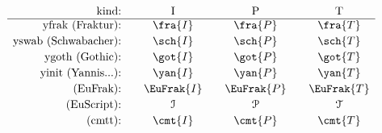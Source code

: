 \documentclass[12pt]{article}
\newcommand{\nor}[1]{{\rm #1}}
\begin{document}
\[ \begin{array}{r@{:\ \ \ \ \ \ }c@{\ \ \ \ \ \ }c@{\ \ \ \ \ \ }c}
\nor{kind}                 & \nor{I}     & \nor{P}     & \nor{T} \\ \hline
\nor{yfrak\ (Fraktur)}     & \fra{I}     & \fra{P}     & \fra{T} \\[.5ex]
\nor{yswab\ (Schwabacher)} & \sch{I}     & \sch{P}     &  \sch{T}\\[.5ex]
\nor{ygoth\ (Gothic)}      & \got{I}     & \got{P}     & \got{T} \\[.5ex]
\nor{yinit\ (Yannis...)}   &  \yan{I}    & \yan{P}     &  \yan{T} \\[.5ex]
\nor{(EuFrak)}             & \EuFrak{I}  & \EuFrak{P}  &  \EuFrak{T} \\[.5ex]
\nor{(EuScript)}           & \EuScript{I}& \EuScript{P}&  \EuScript{T} \\[.5ex]
\nor{(cmtt)}             & \cmt{I  }& \cmt{P  }&  \cmt{T} \\[.5ex]
 \end{array} 
\]
\end{document}
